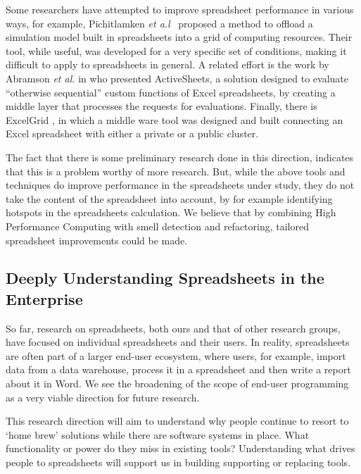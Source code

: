 \documentclass[conference]{IEEEtran}
\begin{document}
Some researchers have attempted to improve spreadsheet performance in various ways, for example, Pichitlamken \emph{et a.l}~\cite{7_pichitlamken_kajkamhaeng_uthayopas_kaewpuang_2010} proposed a method to offload a simulation model built in spreadsheets into a grid of computing resources. Their tool, while useful, was developed for a very specific set of conditions, making it difficult to apply to spreadsheets in general. A related effort is the work by Abramson \emph{et al.} in \cite{6_abramson_roe_kotler_mather_2001} who presented ActiveSheets, a solution designed to evaluate ``otherwise sequential'' custom functions of Excel spreadsheets, by creating a middle layer that processes the requests for evaluations. Finally, there is ExcelGrid \cite{10_nadiminti_chiu_teoh_luther_venugopal_buyya_2004}, in which a middle ware tool was designed and built connecting an Excel spreadsheet with either a private or a public cluster. 

The fact that there is some preliminary research done in this direction, indicates that this is a problem worthy of more research. But, while the above tools and techniques do improve performance in the spreadsheets under study, they do not take the content of the spreadsheet into account, by for example identifying hotspots in the spreadsheets calculation. We believe that by combining High Performance Computing with smell detection and refactoring, tailored spreadsheet improvements could be made.

\subsection{Deeply Understanding Spreadsheets in the Enterprise}
So far, research on spreadsheets, both ours and that of other research groups, have focused on individual spreadsheets and their users. In reality, spreadsheets are often part of a larger end-user ecosystem, where users, for example, import data from a data warehouse, process it in a spreadsheet and then write a report about it in Word. We see the broadening of the scope of end-user programming as a very viable direction for future research. 

This research direction will aim to understand why people continue to resort to `home brew' solutions while there are software systems in place. What functionality or power do they miss in existing tools? Understanding what drives people to spreadsheets will support us in building supporting or replacing tools.
\end{document}
